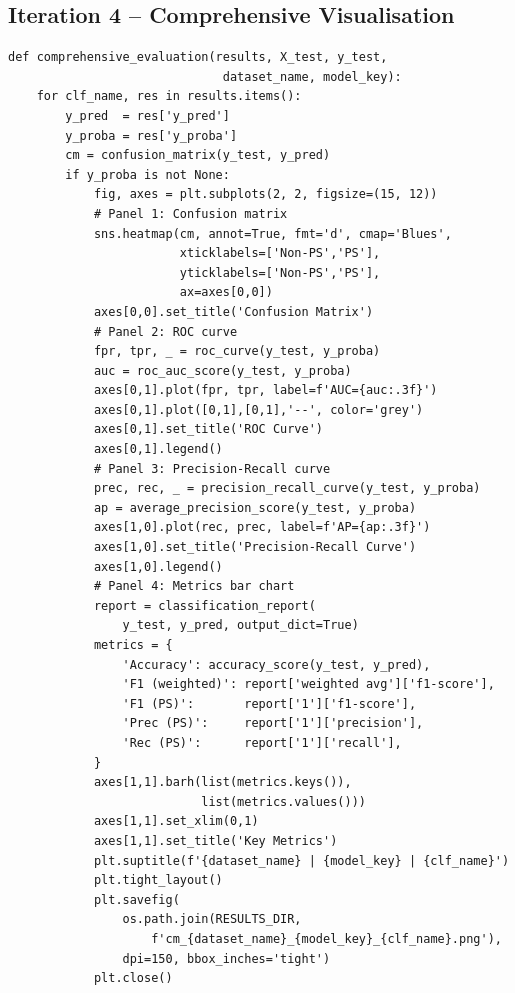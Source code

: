 \documentclass[11pt, titlepage, bibliography=totoc]{scrreprt}
\begin{document}
\subsection*{Iteration 4 -- Comprehensive Visualisation}

\begin{lstlisting}[label=lst:visualization,
  caption={Four-panel evaluation visualisation (confusion matrix, ROC curve, precision-recall curve, metrics bar chart) used in Iteration~4.}]
def comprehensive_evaluation(results, X_test, y_test,
                              dataset_name, model_key):
    for clf_name, res in results.items():
        y_pred  = res['y_pred']
        y_proba = res['y_proba']
        cm = confusion_matrix(y_test, y_pred)
        if y_proba is not None:
            fig, axes = plt.subplots(2, 2, figsize=(15, 12))
            # Panel 1: Confusion matrix
            sns.heatmap(cm, annot=True, fmt='d', cmap='Blues',
                        xticklabels=['Non-PS','PS'],
                        yticklabels=['Non-PS','PS'],
                        ax=axes[0,0])
            axes[0,0].set_title('Confusion Matrix')
            # Panel 2: ROC curve
            fpr, tpr, _ = roc_curve(y_test, y_proba)
            auc = roc_auc_score(y_test, y_proba)
            axes[0,1].plot(fpr, tpr, label=f'AUC={auc:.3f}')
            axes[0,1].plot([0,1],[0,1],'--', color='grey')
            axes[0,1].set_title('ROC Curve')
            axes[0,1].legend()
            # Panel 3: Precision-Recall curve
            prec, rec, _ = precision_recall_curve(y_test, y_proba)
            ap = average_precision_score(y_test, y_proba)
            axes[1,0].plot(rec, prec, label=f'AP={ap:.3f}')
            axes[1,0].set_title('Precision-Recall Curve')
            axes[1,0].legend()
            # Panel 4: Metrics bar chart
            report = classification_report(
                y_test, y_pred, output_dict=True)
            metrics = {
                'Accuracy': accuracy_score(y_test, y_pred),
                'F1 (weighted)': report['weighted avg']['f1-score'],
                'F1 (PS)':       report['1']['f1-score'],
                'Prec (PS)':     report['1']['precision'],
                'Rec (PS)':      report['1']['recall'],
            }
            axes[1,1].barh(list(metrics.keys()),
                           list(metrics.values()))
            axes[1,1].set_xlim(0,1)
            axes[1,1].set_title('Key Metrics')
            plt.suptitle(f'{dataset_name} | {model_key} | {clf_name}')
            plt.tight_layout()
            plt.savefig(
                os.path.join(RESULTS_DIR,
                    f'cm_{dataset_name}_{model_key}_{clf_name}.png'),
                dpi=150, bbox_inches='tight')
            plt.close()
\end{lstlisting}
\end{document}
